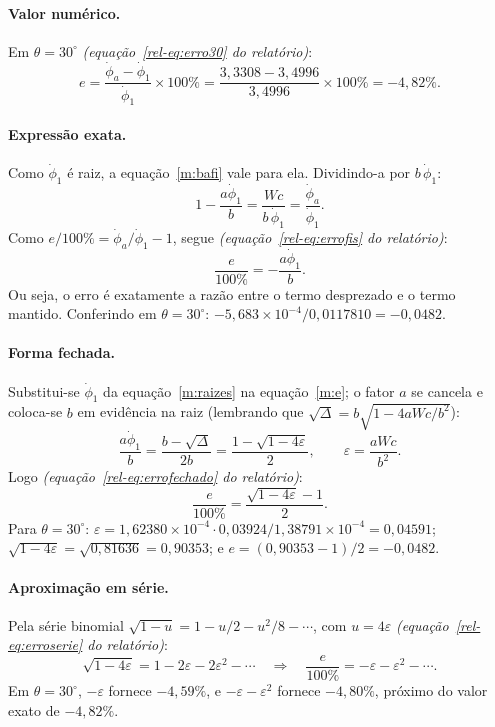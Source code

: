 \documentclass[11pt,a4paper]{article}
\newcommand{\phid}{\dot{\phi}}
\newcommand{\eps}{\varepsilon}
\newcommand{\rel}[1]{\textit{(equação~\ref*{rel-eq:#1} do relatório)}}
\begin{document}
\paragraph{Valor numérico.} Em $\theta=30^\circ$ \rel{erro30}:
\begin{equation}
e=\frac{\phid_a-\phid_1}{\phid_1}\times100\%=\frac{3,3308-3,4996}{3,4996}\times100\%=-4,82\%.
\end{equation}

\paragraph{Expressão exata.} Como $\phid_1$ é raiz, a equação~\ref{m:bafi} vale para ela. Dividindo-a por $b\,\phid_1$:
\begin{equation}
1-\frac{a\phid_1}{b}=\frac{Wc}{b\,\phid_1}=\frac{\phid_a}{\phid_1}.
\end{equation}
Como $e/100\%=\phid_a/\phid_1-1$, segue \rel{errofis}:
\begin{equation}
\frac{e}{100\%}=-\frac{a\phid_1}{b}.\label{m:e}
\end{equation}
Ou seja, o erro é exatamente a razão entre o termo desprezado e o termo mantido. Conferindo em $\theta=30^\circ$: $-5,683\times10^{-4}/0,0117810=-0,0482$.

\paragraph{Forma fechada.} Substitui-se $\phid_1$ da equação~\ref{m:raizes} na equação~\ref{m:e}; o fator $a$ se cancela e coloca-se $b$ em evidência na raiz (lembrando que $\sqrt{\Delta}=b\sqrt{1-4aWc/b^2}$):
\begin{equation}
\frac{a\phid_1}{b}=\frac{b-\sqrt{\Delta}}{2b}=\frac{1-\sqrt{1-4\eps}}{2},\qquad\eps=\frac{aWc}{b^2}.
\end{equation}
Logo \rel{errofechado}:
\begin{equation}
\frac{e}{100\%}=\frac{\sqrt{1-4\eps}-1}{2}.\label{m:efech}
\end{equation}
Para $\theta=30^\circ$: $\eps=1,62380\times10^{-4}\cdot0,03924/1,38791\times10^{-4}=0,04591$; $\sqrt{1-4\eps}=\sqrt{0,81636}=0,90353$; e $e=(0,90353-1)/2=-0,0482$.

\paragraph{Aproximação em série.} Pela série binomial $\sqrt{1-u}=1-u/2-u^2/8-\cdots$, com $u=4\eps$ \rel{erroserie}:
\begin{equation}
\sqrt{1-4\eps}=1-2\eps-2\eps^2-\cdots
\quad\Longrightarrow\quad
\frac{e}{100\%}=-\eps-\eps^2-\cdots.
\end{equation}
Em $\theta=30^\circ$, $-\eps$ fornece $-4,59\%$, e $-\eps-\eps^2$ fornece $-4,80\%$, próximo do valor exato de $-4,82\%$.
\end{document}
